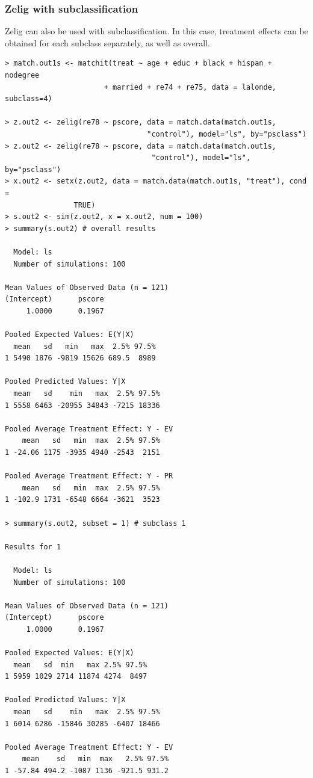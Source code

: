 \documentclass[oneside,letterpaper,titlepage]{article}
\begin{document}
\subsubsection{Zelig with subclassification}
Zelig can also be used with subclassification.  In this case,
treatment effects can be obtained for each subclass separately, as
well as overall.

\begin{verbatim}
> match.out1s <- matchit(treat ~ age + educ + black + hispan + nodegree
                       + married + re74 + re75, data = lalonde, subclass=4)

> z.out2 <- zelig(re78 ~ pscore, data = match.data(match.out1s,
                                 "control"), model="ls", by="psclass")
> z.out2 <- zelig(re78 ~ pscore, data = match.data(match.out1s,
                                  "control"), model="ls", by="psclass")
> x.out2 <- setx(z.out2, data = match.data(match.out1s, "treat"), cond =
                TRUE)
> s.out2 <- sim(z.out2, x = x.out2, num = 100)
> summary(s.out2) # overall results

  Model: ls 
  Number of simulations: 100 

Mean Values of Observed Data (n = 121) 
(Intercept)      pscore 
     1.0000      0.1967 

Pooled Expected Values: E(Y|X)
  mean   sd   min   max  2.5% 97.5%
1 5490 1876 -9819 15626 689.5  8989

Pooled Predicted Values: Y|X
  mean   sd    min   max  2.5% 97.5%
1 5558 6463 -20955 34843 -7215 18336

Pooled Average Treatment Effect: Y - EV
    mean   sd   min  max  2.5% 97.5%
1 -24.06 1175 -3935 4940 -2543  2151

Pooled Average Treatment Effect: Y - PR
    mean   sd   min  max  2.5% 97.5%
1 -102.9 1731 -6548 6664 -3621  3523

> summary(s.out2, subset = 1) # subclass 1

Results for 1 

  Model: ls 
  Number of simulations: 100 

Mean Values of Observed Data (n = 121) 
(Intercept)      pscore 
     1.0000      0.1967 

Pooled Expected Values: E(Y|X)
  mean   sd  min   max 2.5% 97.5%
1 5959 1029 2714 11874 4274  8497

Pooled Predicted Values: Y|X
  mean   sd    min   max  2.5% 97.5%
1 6014 6286 -15846 30285 -6407 18466

Pooled Average Treatment Effect: Y - EV
    mean    sd   min  max   2.5% 97.5%
1 -57.84 494.2 -1087 1136 -921.5 931.2


\end{verbatim}
\end{document}
